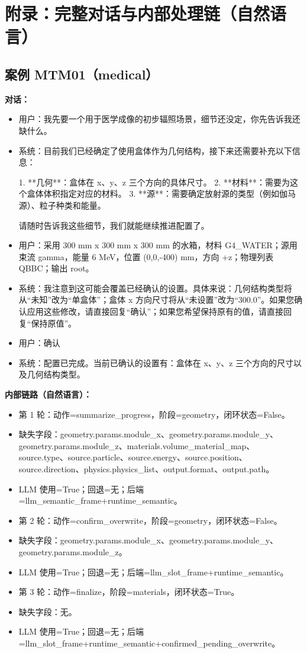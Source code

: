 \documentclass[11pt]{ctexart}
\begin{document}
\section{附录：完整对话与内部处理链（自然语言）}
\subsection{案例 MTM01（medical）}
\textbf{对话：}
\begin{itemize}
\item 用户：我先要一个用于医学成像的初步辐照场景，细节还没定，你先告诉我还缺什么。
\item 系统：目前我们已经确定了使用盒体作为几何结构，接下来还需要补充以下信息：

1.  **几何**：盒体在 x、y、z 三个方向的具体尺寸。
2.  **材料**：需要为这个盒体体积指定对应的材料。
3.  **源**：需要确定放射源的类型（例如伽马源）、粒子种类和能量。

请随时告诉我这些细节，我们就能继续推进配置了。
\item 用户：采用 300 mm x 300 mm x 300 mm 的水箱，材料 G4\_WATER；源用束流 gamma，能量 6 MeV，位置 (0,0,-400) mm，方向 +z；物理列表 QBBC；输出 root。
\item 系统：我注意到这可能会覆盖已经确认的设置。具体来说：几何结构类型将从“未知”改为“单盒体”；盒体 x 方向尺寸将从“未设置”改为“300.0”。如果您确认应用这些修改，请直接回复“确认”；如果您希望保持原有的值，请直接回复“保持原值”。
\item 用户：确认
\item 系统：配置已完成。当前已确认的设置有：盒体在 x、y、z 三个方向的尺寸以及几何结构类型。
\end{itemize}
\textbf{内部链路（自然语言）：}
\begin{itemize}
\item 第 1 轮：动作=summarize\_progress，阶段=geometry，闭环状态=False。
\item 缺失字段：geometry.params.module\_x、geometry.params.module\_y、geometry.params.module\_z、materials.volume\_material\_map、source.type、source.particle、source.energy、source.position、source.direction、physics.physics\_list、output.format、output.path。
\item LLM 使用=True；回退=无；后端=llm\_semantic\_frame+runtime\_semantic。
\item 第 2 轮：动作=confirm\_overwrite，阶段=geometry，闭环状态=False。
\item 缺失字段：geometry.params.module\_x、geometry.params.module\_y、geometry.params.module\_z。
\item LLM 使用=True；回退=无；后端=llm\_slot\_frame+runtime\_semantic。
\item 第 3 轮：动作=finalize，阶段=materials，闭环状态=True。
\item 缺失字段：无。
\item LLM 使用=True；回退=无；后端=llm\_slot\_frame+runtime\_semantic+confirmed\_pending\_overwrite。
\end{itemize}
\end{document}
